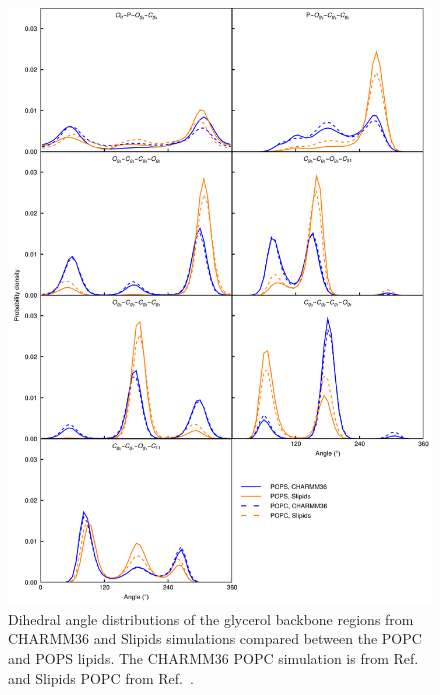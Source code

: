 \documentclass[journal=jpcbfk,manuscript=article]{achemso}
\begin{document}
\begin{figure}[]
  \centering
  \includegraphics[width=15.0cm]{../Figs/figS10.png}
  \caption{\label{dihedralsGLYpc}
    Dihedral angle distributions of the glycerol backbone regions from CHARMM36 and Slipids simulations
    compared between the POPC and POPS lipids.
    The CHARMM36 POPC simulation is from Ref.~ and Slipids POPC from Ref.~.
  }
\end{figure}
\end{document}
